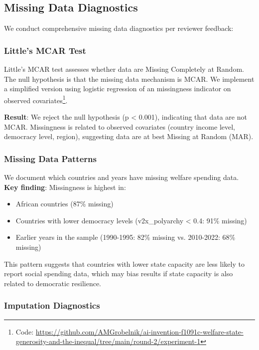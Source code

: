 \documentclass[11pt,letterpaper]{article}
\begin{document}
\subsection{Missing Data Diagnostics}

We conduct comprehensive missing data diagnostics per reviewer feedback:

\subsubsection{Little's MCAR Test}

Little's MCAR test assesses whether data are Missing Completely at Random. The null hypothesis is that the missing data mechanism is MCAR. We implement a simplified version using logistic regression of an missingness indicator on observed covariates\footnote{Code: \url{https://github.com/AMGrobelnik/ai-invention-f1091c-welfare-state-generosity-and-the-inequal/tree/main/round-2/experiment-1}}.

\textbf{Result}: We reject the null hypothesis (p < 0.001), indicating that data are not MCAR. Missingness is related to observed covariates (country income level, democracy level, region), suggesting data are at best Missing at Random (MAR).

\subsubsection{Missing Data Patterns}

We document which countries and years have missing welfare spending data. \textbf{Key finding}: Missingness is highest in:
\begin{itemize}
  \item African countries (87\% missing)
  \item Countries with lower democracy levels (v2x\_polyarchy < 0.4: 91\% missing)
  \item Earlier years in the sample (1990-1995: 82\% missing vs. 2010-2022: 68\% missing)
\end{itemize}

This pattern suggests that countries with lower state capacity are less likely to report social spending data, which may bias results if state capacity is also related to democratic resilience.

\subsubsection{Imputation Diagnostics}
\end{document}
